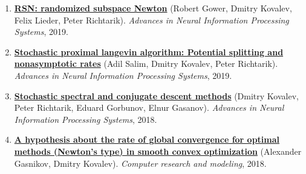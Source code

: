 \begin{enumerate}
\item
\textbf{\href{https://proceedings.neurips.cc/paper/2019/hash/bc6dc48b743dc5d013b1abaebd2faed2-Abstract.html}{RSN: randomized subspace Newton}} (Robert Gower, Dmitry Kovalev, Felix Lieder, Peter Richtarik). \textit{Advances in Neural Information Processing Systems}, 2019.
\item
\textbf{\href{https://proceedings.neurips.cc/paper/2019/hash/6a8018b3a00b69c008601b8becae392b-Abstract.html}{Stochastic proximal langevin algorithm: Potential splitting and nonasymptotic rates}} (Adil Salim, Dmitry Kovalev, Peter Richtarik). \textit{Advances in Neural Information Processing Systems}, 2019.
\item
\textbf{\href{https://proceedings.neurips.cc/paper_files/paper/2018/hash/e721a54a8cf18c8543d44782d9ef681f-Abstract.html}{Stochastic spectral and conjugate descent methods}} (Dmitry Kovalev, Peter Richtarik, Eduard Gorbunov, Elnur Gasanov). \textit{Advances in Neural Information Processing Systems}, 2018.
\item
\textbf{\href{http://crm-en.ics.org.ru/journal/article/2685/}{A hypothesis about the rate of global convergence for optimal methods (Newton’s type) in smooth convex optimization}} (Alexander Gasnikov, Dmitry Kovalev). \textit{Computer research and modeling}, 2018.
\end{enumerate}
